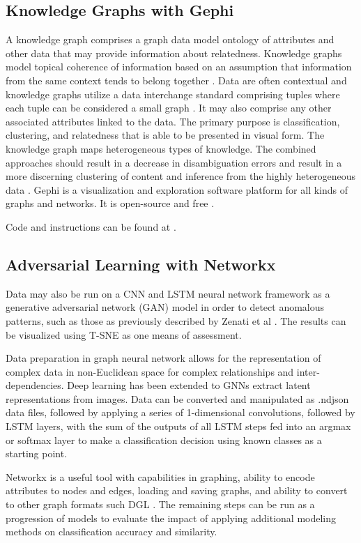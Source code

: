 \documentclass[conference]{IEEEtran}
\begin{document}
\subsection{Knowledge Graphs with Gephi}
A knowledge graph comprises a graph data model ontology of attributes and other data that may provide information about relatedness. Knowledge graphs model topical coherence of information based on an assumption that information from the same context tends to belong together \cite{b58}. Data are often contextual and knowledge graphs utilize a data interchange standard comprising tuples where each tuple can be considered a small graph \cite{b58}. It may also comprise any other associated attributes linked to the data. The primary purpose is classification, clustering, and relatedness that is able to be presented in visual form. The knowledge graph maps heterogeneous types of knowledge. The combined approaches should result in a decrease in disambiguation errors and result in a more discerning clustering of content and inference from the highly heterogeneous data \cite{b59}.
Gephi is a visualization and exploration software platform for all kinds of graphs and networks. It is open-source and free \cite{b60}.

Code and instructions can be found at \cite{b61}.

\subsection{Adversarial Learning with Networkx}
Data may also be run on a CNN and LSTM neural network framework as a generative adversarial network (GAN) model in order to detect anomalous patterns, such as those as previously described by Zenati et al \cite{b62}.  The results can be visualized using T-SNE as one means of assessment.

Data preparation in graph neural network allows for the representation of complex data in non-Euclidean space for complex relationships and inter-dependencies.  Deep learning has been extended to GNNs extract latent representations from images. Data can be converted and manipulated as .ndjson data files, followed by applying a series of 1-dimensional convolutions, followed by LSTM layers, with the sum of the outputs of all LSTM steps fed into an argmax or softmax layer to make a classification decision using known classes as a starting point.

Networkx \cite{b63} is a useful tool with capabilities in graphing, ability to encode attributes to nodes and edges, loading and saving graphs, and ability to convert to other graph formats such DGL \cite{b64}. 
The remaining steps can be run as a progression of models to evaluate the impact of applying additional modeling methods on classification accuracy and similarity.
\end{document}
